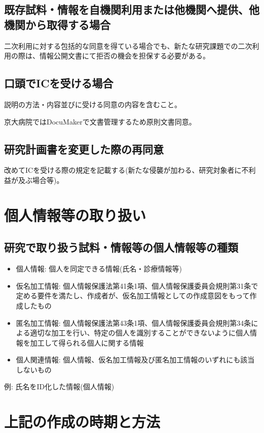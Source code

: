 \documentclass{kyodai-protocol}
\begin{document}
\subsection{既存試料・情報を自機関利用または他機関へ提供、他機関から取得する場合}

二次利用に対する包括的な同意を得ている場合でも、新たな研究課題での二次利用の際は、情報公開文書にて拒否の機会を担保する必要がある。

\subsection{口頭でICを受ける場合}
説明の方法・内容並びに受ける同意の内容を含むこと。

京大病院ではDocuMakerで文書管理するため原則文書同意。

\subsection{研究計画書を変更した際の再同意}
改めてICを受ける際の規定を記載する(新たな侵襲が加わる、研究対象者に不利益が及ぶ場合等)。

\section{個人情報等の取り扱い}
\label{sec:privacy}

\subsection{研究で取り扱う試料・情報等の個人情報等の種類}

\begin{itemize}
\item 個人情報: 個人を同定できる情報(氏名・診療情報等)
\item 仮名加工情報: 個人情報保護法第41条1項、個人情報保護委員会規則第31条で定める要件を満たし、作成者が、仮名加工情報としての作成意図をもって作成したもの
\item 匿名加工情報: 個人情報保護法第43条1項、個人情報保護委員会規則第34条による適切な加工を行い、特定の個人を識別することができないように個人情報を加工して得られる個人に関する情報
\item 個人関連情報: 個人情報、仮名加工情報及び匿名加工情報のいずれにも該当しないもの
\end{itemize}

例: 氏名をID化した情報(個人情報)

\section{上記の作成の時期と方法}
\end{document}
